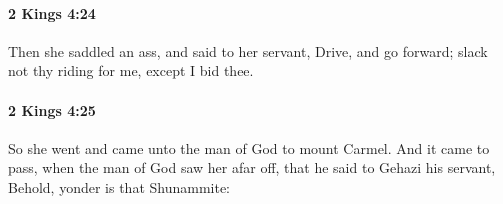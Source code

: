		\paragraph{2 Kings 4:24} %
			\label{2KINGS-4-24}

			Then she saddled an ass, and said to her servant, Drive, and go forward; slack not thy riding for me, except I bid thee.


		\paragraph{2 Kings 4:25} %
			\label{2KINGS-4-25}

			So she went and came unto the man of God to mount Carmel. And it came to pass, when the man of God saw her afar off, that he said to Gehazi his servant, Behold, yonder is that Shunammite:


